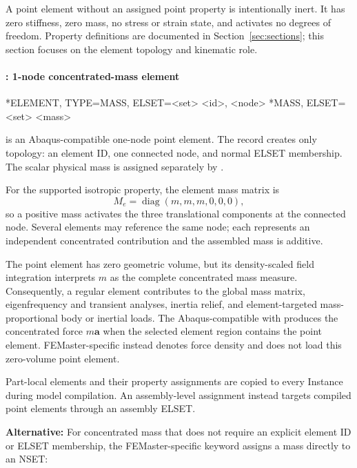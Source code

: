 A point element without an assigned point property is intentionally inert. It has zero stiffness, zero mass, no stress or strain state, and activates no degrees of freedom. Property definitions are documented in Section~\ref{sec:sections}; this section focuses on the element topology and kinematic role.

\clearpage
\paragraph{: 1-node concentrated-mass element}

\begin{syntax}
*ELEMENT, TYPE=MASS, ELSET=<set>
<id>, <node>
*MASS, ELSET=<set>
<mass>
\end{syntax}

 is an Abaqus-compatible one-node point element. The  record creates only topology: an element ID, one connected node, and normal ELSET membership. The scalar physical mass is assigned separately by .

For the supported isotropic property, the element mass matrix is
\[
M_e=\operatorname{diag}(m,m,m,0,0,0),
\]
so a positive mass activates the three translational components at the connected node. Several  elements may reference the same node; each represents an independent concentrated contribution and the assembled mass is additive.

The point element has zero geometric volume, but its density-scaled field integration interprets \(m\) as the complete concentrated mass measure. Consequently, a regular  element contributes to the global mass matrix, eigenfrequency and transient analyses, inertia relief, and element-targeted mass-proportional body or inertial loads. The Abaqus-compatible  with  produces the concentrated force \(m\boldsymbol a\) when the selected element region contains the point element. FEMaster-specific  instead denotes force density and does not load this zero-volume point element.

Part-local  elements and their  property assignments are copied to every Instance during model compilation. An assembly-level  assignment instead targets compiled point elements through an assembly ELSET.

\textbf{Alternative:} For concentrated mass that does not require
an explicit element ID or ELSET membership, the FEMaster-specific
 keyword assigns a mass directly to an NSET:

